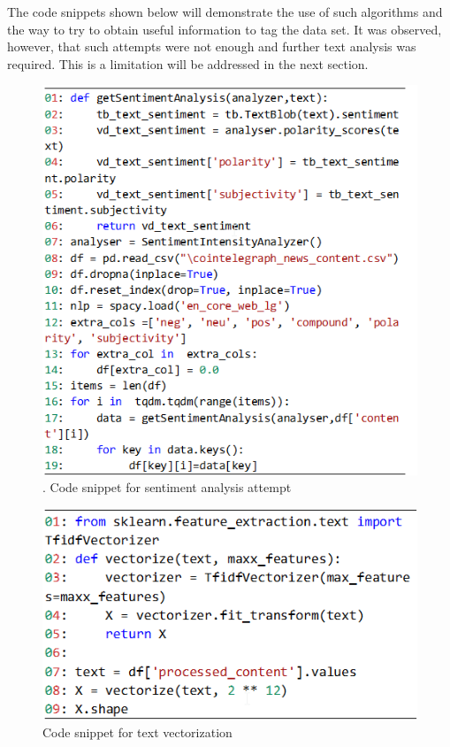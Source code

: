 The code snippets shown below will demonstrate the use of such algorithms and the way to try to obtain useful information to tag the data set. It was observed, however, that such attempts were not enough and further text analysis was required. This is a limitation will be addressed in the next section.

\begin{figure}[H]
   \centering
   \includegraphics[width=\linewidth]{fig/CodeSnippetSentimentAnalysis.png}
    \caption{. Code snippet for sentiment analysis attempt}
    \label{fig:CodeSnippetSentimentAnalysis}
\end{figure}

\begin{figure}[t]
   \centering
   \includegraphics[width=\linewidth]{fig/CodeSnippetVectorization.png}
    \caption{Code snippet for text vectorization}
    \label{fig:CodeSnippetVectorization}
\end{figure}

